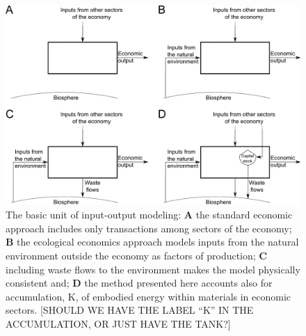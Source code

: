 \begin{figure}[!ht]
\centering{}
\includegraphics[width=\linewidth]{Part_0/Chapter_Introduction/images/Basic_unit_square.pdf}
\caption[The basic unit of input-output modeling]{The basic unit of input-output modeling: \textbf{A} the standard economic approach includes only transactions among sectors of the economy; \textbf{B} the ecological economics approach models inputs from the natural environment outside the economy as factors of production; \textbf{C} including waste flows to the environment makes the model physically consistent and; \textbf{D} the method presented here accounts also for accumulation, K, of embodied energy within materials in economic sectors. [SHOULD WE HAVE THE LABEL ``K'' IN THE ACCUMULATION, OR JUST HAVE THE TANK?]}
\label{fig:basic_unit}
\end{figure}
%

